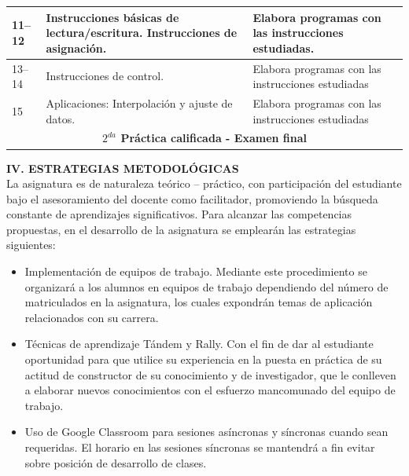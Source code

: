 \documentclass[12pt,a4paper]{article}
\begin{document}
\begin{tabular} { | p{1.25cm} | p{8.75cm} | p{5cm} | }
\hline 
11\hspace{0.1cm}--\hspace{0.1cm}12 & {Instrucciones básicas de lectura/escritura. Instrucciones de asignación.} & {Elabora programas con las instrucciones estudiadas.} \\ 
\hline
13\hspace{0.1cm}--\hspace{0.1cm}14 & {Instrucciones de control.} & {Elabora programas con las instrucciones estudiadas} \\ 
\hline
15 & {Aplicaciones: Interpolación y ajuste de datos.} & {Elabora programas con las instrucciones estudiadas} \\ 
\hline
\multicolumn{3}{|c|}{\textbf{$2^{da}$ Práctica calificada - Examen final}} \\
\hline
\end{tabular} 

\vspace{12pt}
\textbf{IV.	ESTRATEGIAS METODOLÓGICAS}\\
La asignatura es de naturaleza teórico – práctico, con participación del estudiante bajo el asesoramiento del docente como facilitador, promoviendo la búsqueda constante de aprendizajes significativos. Para alcanzar las competencias propuestas, en el desarrollo de la asignatura se emplearán las estrategias siguientes:
\begin{itemize}
\item Implementación de equipos de trabajo. Mediante este procedimiento se organizará a los alumnos en equipos de trabajo dependiendo del número de matriculados en la asignatura, los cuales expondrán temas de aplicación relacionados con su carrera.
\item Técnicas de aprendizaje Tándem y Rally. Con el fin de dar al estudiante oportunidad para que utilice su experiencia en la puesta en práctica de su actitud de constructor de su conocimiento y de investigador, que le conlleven a elaborar nuevos conocimientos con el esfuerzo mancomunado del equipo de trabajo.
\item Uso de Google Classroom para sesiones asíncronas y síncronas cuando sean requeridas. El horario en las sesiones síncronas se mantendrá a fin evitar sobre posición de desarrollo de clases.
\end{itemize}
\end{document}
